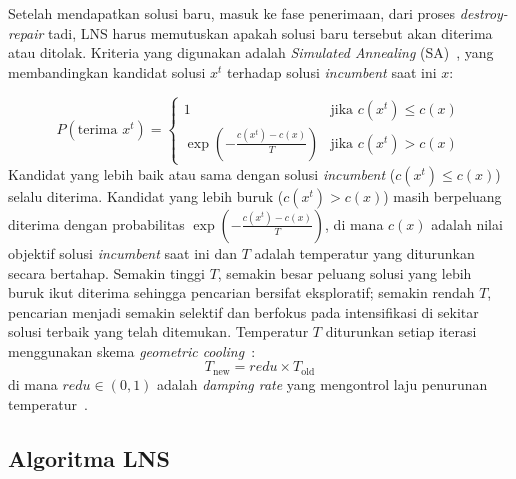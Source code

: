 \documentclass{file/TA-ITS}
\theoremstyle{definition}
\theoremstyle{definition}
\theoremstyle{plain}
\begin{document}
Setelah mendapatkan solusi baru, masuk ke fase penerimaan, dari proses \textit{destroy-repair} tadi, LNS harus memutuskan apakah solusi baru tersebut akan diterima atau ditolak. Kriteria yang digunakan adalah \textit{Simulated Annealing} (SA)~\cite{pisinger2018lns}, yang membandingkan kandidat solusi $x^t$ terhadap solusi \textit{incumbent} saat ini $x$:

\begin{equation}
\label{eq:sa_accept_incumbent}
P(\text{terima } x^t) = \begin{cases}
1 & \text{jika } c(x^t) \leq c(x) \\
\exp\left(-\frac{c(x^t) - c(x)}{T}\right) & \text{jika } c(x^t) > c(x)
\end{cases}
\end{equation}
Kandidat yang lebih baik atau sama dengan solusi \textit{incumbent} ($c(x^t) \leq c(x)$) selalu diterima. Kandidat yang lebih buruk ($c(x^t) > c(x)$) masih berpeluang diterima dengan probabilitas $\exp\!\left(-\tfrac{c(x^t)-c(x)}{T}\right)$, di mana $c(x)$ adalah nilai objektif solusi \textit{incumbent} saat ini dan $T$ adalah temperatur yang diturunkan secara bertahap. Semakin tinggi $T$, semakin besar peluang solusi yang lebih buruk ikut diterima sehingga pencarian bersifat eksploratif; semakin rendah $T$, pencarian menjadi semakin selektif dan berfokus pada intensifikasi di sekitar solusi terbaik yang telah ditemukan. Temperatur $T$ diturunkan setiap iterasi menggunakan skema \textit{geometric cooling}~\cite{pisinger2018lns, fathollahifard2023alns}:
\begin{equation}
\label{eq:geometric_cooling}
T_{\text{new}} = redu \times T_{\text{old}}
\end{equation}
di mana $redu \in (0,1)$ adalah \textit{damping rate} yang mengontrol laju penurunan temperatur~\cite{fathollahifard2023alns}.

\subsection{Algoritma LNS}
\end{document}
